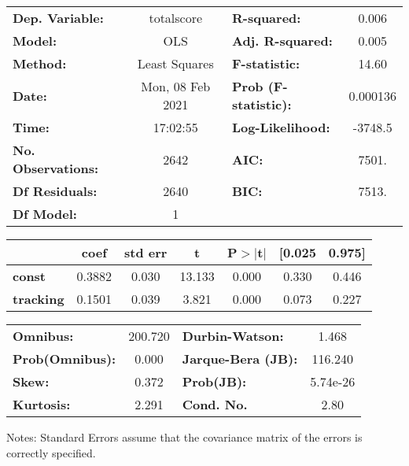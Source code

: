 \begin{center}
\begin{tabular}{lclc}
\toprule
\textbf{Dep. Variable:}    &    totalscore    & \textbf{  R-squared:         } &     0.006   \\
\textbf{Model:}            &       OLS        & \textbf{  Adj. R-squared:    } &     0.005   \\
\textbf{Method:}           &  Least Squares   & \textbf{  F-statistic:       } &     14.60   \\
\textbf{Date:}             & Mon, 08 Feb 2021 & \textbf{  Prob (F-statistic):} &  0.000136   \\
\textbf{Time:}             &     17:02:55     & \textbf{  Log-Likelihood:    } &   -3748.5   \\
\textbf{No. Observations:} &        2642      & \textbf{  AIC:               } &     7501.   \\
\textbf{Df Residuals:}     &        2640      & \textbf{  BIC:               } &     7513.   \\
\textbf{Df Model:}         &           1      & \textbf{                     } &             \\
\bottomrule
\end{tabular}
\begin{tabular}{lcccccc}
                  & \textbf{coef} & \textbf{std err} & \textbf{t} & \textbf{P$> |$t$|$} & \textbf{[0.025} & \textbf{0.975]}  \\
\midrule
\textbf{const}    &       0.3882  &        0.030     &    13.133  &         0.000        &        0.330    &        0.446     \\
\textbf{tracking} &       0.1501  &        0.039     &     3.821  &         0.000        &        0.073    &        0.227     \\
\bottomrule
\end{tabular}
\begin{tabular}{lclc}
\textbf{Omnibus:}       & 200.720 & \textbf{  Durbin-Watson:     } &    1.468  \\
\textbf{Prob(Omnibus):} &   0.000 & \textbf{  Jarque-Bera (JB):  } &  116.240  \\
\textbf{Skew:}          &   0.372 & \textbf{  Prob(JB):          } & 5.74e-26  \\
\textbf{Kurtosis:}      &   2.291 & \textbf{  Cond. No.          } &     2.80  \\
\bottomrule
\end{tabular}
\end{center}

Notes: \newline
 [1] Standard Errors assume that the covariance matrix of the errors is correctly specified.
